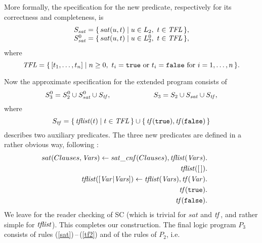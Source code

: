 \documentclass{tlp}
\newcommand*{\seq}[2][n]  {{#2_{1}, \allowbreak \ldots, \allowbreak #2_{#1}}}
\begin{document}
More formally, the specification for the new predicate, respectively for its
correctness and completeness, is
\[
\begin{array}{c}
S_{\it sat} = \{\, sat(u,t) \mid u\in L_2,\ t\in{\it T F L} \,\},
\\
S_{\it sat}^0 = \{\, sat(u,t) \mid u\in L_2^0,\ t\in{\it T F L} \,\},
\end{array}
\vspace{-1ex}
\]
where
\[
{\it T F L} =
 \{\, [\seq t] \mid n\geq0,\
                     t_i={\tt true} \mbox{ or } t_i={\tt false} 
\mbox{ for } i=1,\ldots,n  \,\}.
\]


Now the approximate specification for the extended program consists of
\[
S_3^0 = S_2^0\cup S_{\it sat}^0 \cup S_{\it t f},
    \qquad
     \qquad\qquad
    S_3 = S_2\cup S_{\it sat} \cup S_{\it t f},
\vspace{-1.5ex plus 1ex}
\]
where
\vspace{-1.5ex plus 1ex}
\[
      S_{\it t f} =
      \{\,    {\it t f list}(t) \mid t\in {\it T F L}  \,\}
\cup {} 
\{\, {\it t f}({\tt true}),   {\it t f}({\tt false}) \,\}  
\]
describes two auxiliary predicates.
The three new predicates are defined in a rather obvious way, following \cite{howe.king.tcs-shorter}:
{ \newcommand{\mynegskip}{\hspace*{-3em}}
    \begin{eqnarray}
    &&
    \mynegskip
    sat(Clauses, {\it Vars}) \gets
        {\it sat\_c n f}(Clauses), {\it t f list}({\it {\it Var}s}).   
    \label{sat}
    \\
    &&
   \mynegskip
    {\it t f list}([\,]). 
    \label{tflist1}
    \\&&
   \mynegskip
    {\it t f list}([{\it Var} | {\it Vars}]) \gets
        {\it t f list}({\it Vars}), {\it t f}({\it Var}).
    \\&&
   \mynegskip
{\it t f}({\tt true}). \\&&     \mynegskip  {\it t f}({\tt false}).
    \label{tf2}
    \end{eqnarray}
}We leave for the reader checking of SC (which is trivial for $sat$ and
${\it t f}$, and rather simple for ${\it t f list}$).
\label{final.program}
This completes our construction.
The final logic program $P_3$ consists of rules (\ref{sat})\,--\,(\ref{tf2})
and of the rules of $P_2$, i.e.\
\end{document}
